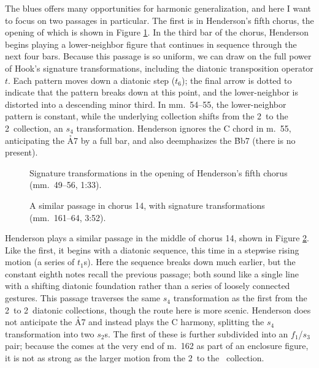 The blues offers many opportunities for harmonic generalization, and here I
want to focus on two passages in particular. The first is in
Henderson's fifth chorus, the opening of which is shown in Figure
\ref{csa:henderson-chorus-five}. In the third bar of the chorus, Henderson
begins playing a lower-neighbor figure that continues in sequence through the
next four bars. Because this passage is so uniform, we can draw on the full
power of Hook's signature transformations, including the diatonic
transposition operator $t$. Each pattern moves down a diatonic step
($t_6$); the final arrow is dotted to indicate that the pattern breaks down at
this point, and the lower-neighbor is distorted into a descending minor third.
In mm.~54--55, the lower-neighbor pattern is constant, while the underlying
collection shifts from the 2\flat\ to the 2\sharp\ collection, an $s_4$
transformation. Henderson ignores the C chord in m.~55,
anticipating the \h{A7} by a full bar, and also deemphasizes the \h{Bb7}
(there is no \Aflat present).

\begin{figure}[tbp]
  \caption[Signature transformations in the opening of Henderson's fifth
    chorus.]{Signature transformations in the opening of Henderson's fifth
    chorus (mm.~49--56, 1:33).}
  \label{csa:henderson-chorus-five}
\end{figure}

\begin{figure}[tbp]
  \caption[A similar passage in chorus 14, with signature transformations.]{A
    similar passage in chorus 14, with signature transformations
    (mm.~161--64, 3:52).}
  \label{csa:henderson-chorus-fourteen}
\end{figure}

Henderson plays a similar passage in the middle of chorus 14, shown in Figure
\ref{csa:henderson-chorus-fourteen}. Like the first, it begins with a diatonic
sequence, this time in a stepwise rising motion (a series of $t_1$s). Here the
sequence breaks down much earlier, but the constant eighth notes recall the
previous passage; both sound like a single line with a shifting diatonic
foundation rather than a series of loosely connected gestures. This passage
traverses the same $s_4$ transformation as the first from the 2\flat\ to
2\sharp\ diatonic collections, though the route here is more scenic. Henderson
does not anticipate the \h{A7} and instead plays the C harmony, splitting the
$s_4$ transformation into two $s_2$s. The first of these is further subdivided
into an $f_1$/$s_3$ pair; because the \Aflat comes at the very end of m.~162
as part of an enclosure figure, it is not as strong as the larger motion from
the 2\flat\ to the \nat\ collection.

